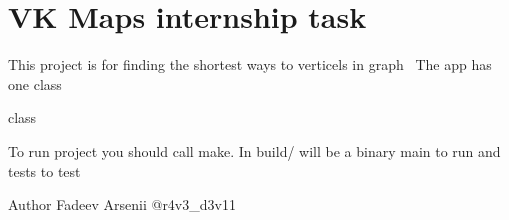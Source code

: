 \chapter{VK Maps internship task}
\hypertarget{index}{}\label{index}
This project is for finding the shortest ways to verticels in graph~\newline
The app has one class
\begin{DoxyItemize}
\item {} class
\end{DoxyItemize}

To run project you should call make. In build/ will be a binary \textquotesingle{}main\textquotesingle{} to run and \textquotesingle{}tests\textquotesingle{} to test

\begin{DoxyAuthor}{Author}
Fadeev Arsenii @r4v3\+\_\+d3v11 
\end{DoxyAuthor}
